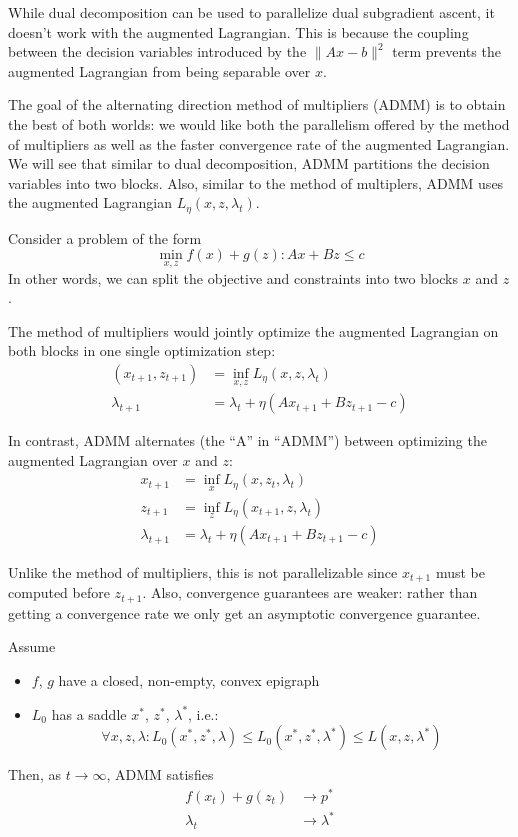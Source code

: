 While dual decomposition can be used to parallelize dual subgradient ascent,
it doesn't work with the augmented Lagrangian. This is because the coupling between
the decision variables introduced by the $\| A x - b \|^2$ term prevents
the augmented Lagrangian from being separable over $x$.

The goal of the alternating direction method of multipliers (ADMM) is to obtain
the best of both worlds: we would like both the parallelism offered by the method
of multipliers as well as the faster convergence rate of the augmented Lagrangian.
We will see that similar to dual decomposition, ADMM partitions
the decision variables into two blocks. Also, similar to the method of multiplers,
ADMM uses the augmented Lagrangian $L_\eta(x,z,\lambda_t)$.

Consider a problem of the form
\[
\min_{x,z} f(x) + g(z) : A x + B z \leq c
\]
In other words, we can split the objective and constraints into two blocks $x$ and $z$.

The method of multipliers would jointly optimize the augmented Lagrangian
on both blocks in one single optimization step:
\begin{align*}
(x_{t+1}, z_{t+1}) &= \inf_{x,z} L_\eta(x,z,\lambda_t)\\
\lambda_{t+1} &= \lambda_t + \eta(A x_{t+1} + B z_{t+1} - c)
\end{align*}

In contrast, ADMM alternates (the ``A'' in ``ADMM'') between optimizing
the augmented Lagrangian over $x$ and $z$:
\begin{align*}
x_{t+1} &= \inf_{x} L_\eta(x, z_t, \lambda_t) \\
z_{t+1} &= \inf_{z} L_\eta(x_{t+1}, z, \lambda_t) \\
\lambda_{t+1} &= \lambda_t + \eta(A x_{t+1} + B z_{t+1} - c)
\end{align*}

Unlike the method of multipliers, this is not parallelizable
since $x_{t+1}$ must be computed before $z_{t+1}$. Also, convergence
guarantees are weaker: rather than getting a convergence rate we only get an asymptotic
convergence guarantee.

\begin{theorem}
Assume
\begin{itemize}
\item $f$, $g$ have a closed, non-empty, convex
epigraph
\item $L_0$ has a saddle $x^*$, $z^*$, $\lambda^*$, i.e.:
\[
\forall x,z,\lambda: L_0(x^*,z^*,\lambda) \leq L_0(x^*,z^*,\lambda^*)\leq L(x,z,\lambda^*)
\]
\end{itemize}
Then, as $t \to \infty$, ADMM satisfies
\begin{align*}
f(x_t) + g(z_t) &\to p^*\\
\lambda_t &\to \lambda^*
\end{align*}
\end{theorem}


